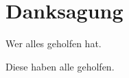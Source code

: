 \section*{Danksagung}
\label{sec:problemstellung}

\begin{abstractsec}
  Wer alles geholfen hat.
\end{abstractsec}
\begin{normaltext}
  Diese haben alle geholfen.
\end{normaltext}

